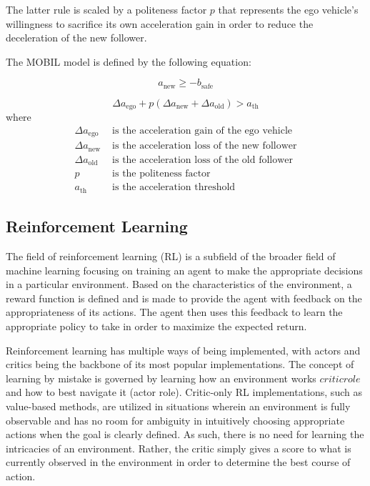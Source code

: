 \documentclass[12pt, a4paper]{report}
\begin{document}
The latter rule is scaled by a politeness factor \(p\) that represents the ego vehicle's willingness to sacrifice its own acceleration gain 
in order to reduce the deceleration of the new follower.

The MOBIL model is defined by the following equation:

\begin{equation}
    a_{\text{new}} \geq -b_{\text{safe}}
\end{equation}

\begin{equation}
\Delta a_{\text{ego}} + p \left( \Delta a_{\text{new}} + \Delta a_{\text{old}} \right) > a_{\text{th}}
\end{equation}
where
\begin{align}
    \Delta a_{\text{ego}} & \text{ is the acceleration gain of the ego vehicle} \\
    \Delta a_{\text{new}} & \text{ is the acceleration loss of the new follower} \\
    \Delta a_{\text{old}} & \text{ is the acceleration loss of the old follower} \\
    p & \text{ is the politeness factor} \\
    a_{\text{th}} & \text{ is the acceleration threshold}
\end{align}



\subsection{Reinforcement Learning}

The field of reinforcement learning (RL) is a subfield of the broader field of machine learning focusing on training an agent
to make the appropriate decisions in a particular environment. Based on the characteristics of the environment, a reward function
is defined and is made to provide the agent with feedback on the appropriateness of its actions. The agent then uses this feedback to 
learn the appropriate policy to take in order to maximize the expected return.

Reinforcement learning has multiple ways of being implemented, with actors and critics being the backbone of its most popular implementations.
The concept of learning by mistake is governed by learning how an environment works \(critic role\) and how to best navigate it (actor role).
Critic-only RL implementations, such as value-based methods, are utilized in situations wherein an environment is fully observable and has no
room for ambiguity in intuitively choosing appropriate actions when the goal is clearly defined. As such, there is no need for learning the intricacies of
an environment. Rather, the critic simply gives a score to what is currently observed in the environment in order to determine the best course of action.
\end{document}
